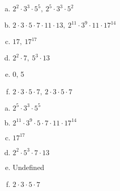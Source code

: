\begin{itemize}
\begin{enumerate}[a.]
              \item $2^2 \cdot 3^3 \cdot 5^5, \ 2^5 \cdot 3^3 \cdot 5^2$
              \item $2 \cdot 3 \cdot 5 \cdot 7 \cdot 11 \cdot 13, \ 2^{11} \cdot 3^9 \cdot 11 \cdot 17^{14}$
              \item $17,\  17^{17}$
              \item $2^2 \cdot 7,\ 5^3 \cdot 13$
              \item 0, 5
              \item $2 \cdot 3 \cdot 5 \cdot 7,\  2 \cdot 3 \cdot 5 \cdot 7$
          \end{enumerate}
          \answer
          \begin{enumerate}[a.]
              \item $2^5 \cdot 3^3 \cdot 5^5$
              \item $2^{11} \cdot 3^9 \cdot 5 \cdot 7 \cdot 11 \cdot 17^{14}$
              \item $17^{17}$
              \item $2^2 \cdot 5^3 \cdot 7 \cdot 13$
              \item Undefined
              \item $2 \cdot 3 \cdot 5 \cdot 7$
          \end{enumerate}
\end{itemize}

